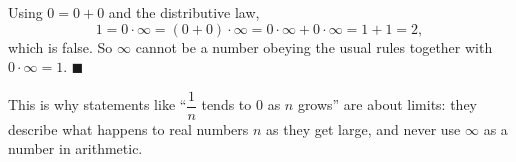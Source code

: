 Using $0=0+0$ and the distributive law,
\[1=0\cdot\infty=(0+0)\cdot\infty=0\cdot\infty+0\cdot\infty=1+1=2,\]
which is false. So $\infty$ cannot be a number obeying the usual rules together with $0\cdot\infty=1$. $\blacksquare$

This is why statements like ``$\dfrac1n$ tends to $0$ as $n$ grows'' are about limits: they describe what happens to real numbers $n$ as they get large, and never use $\infty$ as a number in arithmetic.
